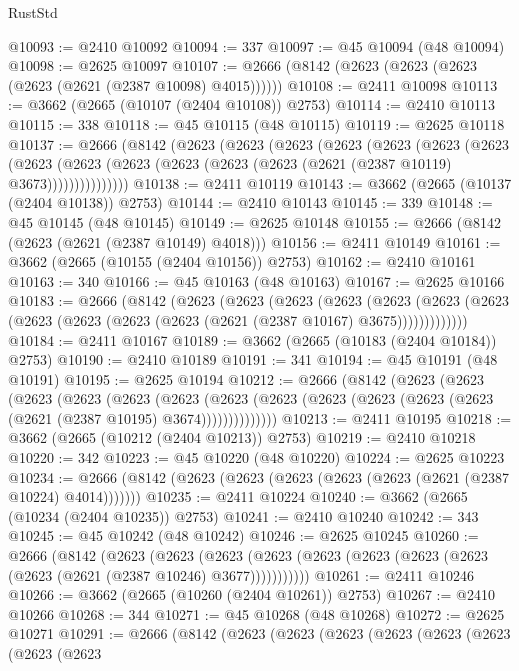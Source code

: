 \begin{lexlean}{RustStd}
\begin{coremodule}
@10093 := @2410 @10092
@10094 := 337
@10097 := @45 @10094 (@48 @10094)
@10098 := @2625 @10097
@10107 := @2666 (@8142 (@2623 (@2623 (@2623 (@2623 (@2621 (@2387 @10098) @4015))))))
@10108 := @2411 @10098
@10113 := @3662 (@2665 (@10107 (@2404 @10108)) @2753)
@10114 := @2410 @10113
@10115 := 338
@10118 := @45 @10115 (@48 @10115)
@10119 := @2625 @10118
@10137 := @2666
    (@8142
      (@2623
        (@2623
          (@2623
            (@2623
              (@2623
                (@2623
                  (@2623
                    (@2623
                      (@2623 (@2623 (@2623 (@2623 (@2623 (@2621 (@2387 @10119) @3673)))))))))))))))
@10138 := @2411 @10119
@10143 := @3662 (@2665 (@10137 (@2404 @10138)) @2753)
@10144 := @2410 @10143
@10145 := 339
@10148 := @45 @10145 (@48 @10145)
@10149 := @2625 @10148
@10155 := @2666 (@8142 (@2623 (@2621 (@2387 @10149) @4018)))
@10156 := @2411 @10149
@10161 := @3662 (@2665 (@10155 (@2404 @10156)) @2753)
@10162 := @2410 @10161
@10163 := 340
@10166 := @45 @10163 (@48 @10163)
@10167 := @2625 @10166
@10183 := @2666
    (@8142
      (@2623
        (@2623
          (@2623
            (@2623
              (@2623
                (@2623 (@2623 (@2623 (@2623 (@2623 (@2623 (@2621 (@2387 @10167) @3675)))))))))))))
@10184 := @2411 @10167
@10189 := @3662 (@2665 (@10183 (@2404 @10184)) @2753)
@10190 := @2410 @10189
@10191 := 341
@10194 := @45 @10191 (@48 @10191)
@10195 := @2625 @10194
@10212 := @2666
    (@8142
      (@2623
        (@2623
          (@2623
            (@2623
              (@2623
                (@2623
                  (@2623
                    (@2623 (@2623 (@2623 (@2623 (@2623 (@2621 (@2387 @10195) @3674))))))))))))))
@10213 := @2411 @10195
@10218 := @3662 (@2665 (@10212 (@2404 @10213)) @2753)
@10219 := @2410 @10218
@10220 := 342
@10223 := @45 @10220 (@48 @10220)
@10224 := @2625 @10223
@10234 := @2666 (@8142 (@2623 (@2623 (@2623 (@2623 (@2623 (@2621 (@2387 @10224) @4014)))))))
@10235 := @2411 @10224
@10240 := @3662 (@2665 (@10234 (@2404 @10235)) @2753)
@10241 := @2410 @10240
@10242 := 343
@10245 := @45 @10242 (@48 @10242)
@10246 := @2625 @10245
@10260 := @2666
    (@8142
      (@2623
        (@2623
          (@2623 (@2623 (@2623 (@2623 (@2623 (@2623 (@2623 (@2621 (@2387 @10246) @3677)))))))))))
@10261 := @2411 @10246
@10266 := @3662 (@2665 (@10260 (@2404 @10261)) @2753)
@10267 := @2410 @10266
@10268 := 344
@10271 := @45 @10268 (@48 @10268)
@10272 := @2625 @10271
@10291 := @2666
    (@8142
      (@2623
        (@2623
          (@2623
            (@2623
              (@2623
                (@2623
                  (@2623
                    (@2623

\end{coremodule}
\end{lexlean}
